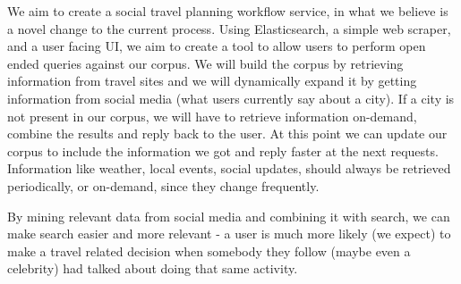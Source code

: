 We aim to create a social travel planning workflow service, in what we believe is a novel change to the current process. Using Elasticsearch, a simple web scraper, and a user facing UI, we aim to create a tool to allow users to perform open ended queries against our corpus. We will build the corpus by retrieving information from travel sites and we will dynamically expand it by getting information from social media (what users currently say about a city).
If a city is not present in our corpus, we will have to retrieve information on-demand, combine the results and reply back to the user. At this point we can update our corpus to include the information we got and reply faster at  the next requests. Information like weather, local events, social updates, should always be retrieved periodically, or on-demand, since they change frequently.

By mining relevant data from social media and combining it with search, we can make search easier and more relevant - a user is much more likely (we expect) to make a travel related decision when somebody they follow (maybe even a celebrity) had talked about doing that same activity. 

